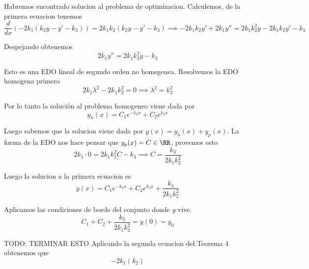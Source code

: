 \documentclass[a4paper,oneside,10.5pt]{USMArt}
\begin{document}
\begin{sol}
\begin{enumerate}
        Habremos encontrado solucion al problema de optimizacion. Calculemos, de la primera ecuacion tenemos
        \begin{equation*}
          \frac{d}{dx}(-2k_{1}(k_{2}y - y' - k_{3})) = 2k_{1}k_{2}(k_{2}y - y' -k_{3}) \implies -2k_{1}k_{2}y' + 2k_{1}y'' = 2k_{1}k_{2}^{2}y - 2k_{1}k_{2}y' - k_{3}
        \end{equation*}

        Despejando obtenemos
        \begin{equation*}
          2k_{1}y'' = 2k_{1}k_{2}^{2}y - k_{3}
        \end{equation*}

        Esto es una EDO lineal de segundo orden no homegenea. Resolvemos la EDO homogena primero
        \begin{equation*}
          2k_{1} \lambda^{2} - 2k_{1}k_{2}^{2} = 0 \implies \lambda^{2} = k_{2}^{2}
        \end{equation*}

        Por lo tanto la soluci\'on al problema homogeneo viene dada por
        \begin{equation*}
          y_{h}(x) = C_{1}e^{-k_{2}x} + C_{2}e^{k_{2}x}
        \end{equation*}

        Luego sabemos que la solucion viene dada por $y(x) = y_{h}(x) + y_{p}(x)$. La forma de la EDO nos hace
        pensar que $y_{p}(x) = C \in \RR$, provemos esto
        \begin{equation*}
          2k_{1}\cdot 0 = 2k_{1}k_{2}^{2}C - k_{3} \implies C = \frac{k_{3}}{2k_{1}k_{2}^{2}}
        \end{equation*}

        Luego la solucion a la primera ecuacion es
        \begin{equation*}
          y(x) = C_{1}e^{-k_{2}x} + C_{2}e^{k_{2}x} + \frac{k_{3}}{2k_{1}k_{2}^{2}}
        \end{equation*}

        Aplicamos las condiciones de borde del conjunto donde $y$ vive.
        \begin{equation*}
          C_{1} + C_{2} + \frac{k_{3}}{2k_{1}k_{2}^{2}}= y(0) = y_{0}
        \end{equation*}

        TODO: TERMINAR ESTO
        Aplicando la segunda ecuacion del Teorema 4 obtenemos que
        \begin{equation*}
          -2k_{1}(k_{2})
        \end{equation*}

\end{enumerate}
\end{sol}
\end{document}
